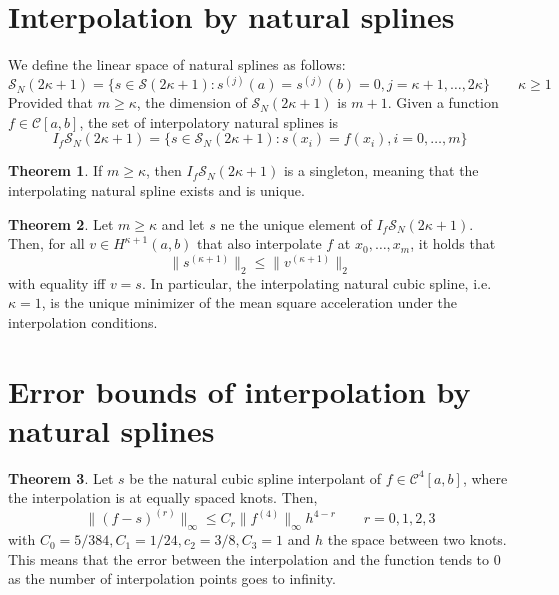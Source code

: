 \documentclass[12pt, openany]{report}
\theoremstyle{definition}
\newtheorem{thm}{Theorem}[chapter]
\begin{document}
\section{Interpolation by natural splines}
We define the linear space of natural splines as follows:
\begin{equation}
    \mathcal{S}_N(2\kappa +1) = \{s\in \mathcal{S}(2\kappa+1):s^{(j)}(a)=s^{(j)}(b)=0,j=\kappa+1,\dots,2\kappa\} \qquad \kappa \ge 1
\end{equation}
Provided that $m\ge\kappa$, the dimension of $\mathcal{S}_N(2\kappa+1)$ is $m+1$. Given a function $f\in \mathcal{C}[a,b]$, the set of interpolatory natural splines is 
\begin{equation}
    I_f\mathcal{S}_N(2\kappa+1)=\{s\in \mathcal{S}_N(2\kappa+1):s(x_i)=f(x_i), i=0,\dots,m\}
\end{equation}
\begin{thm}
    If $m\ge \kappa$, then $I_f\mathcal{S}_N(2\kappa+1)$ is a singleton, meaning that the interpolating natural spline exists and is unique. 
\end{thm}
\begin{thm}
    Let $m\ge \kappa$ and let $s$ ne the unique element of $I_f\mathcal{S}_N(2\kappa+1)$. Then, for all $v\in H^{\kappa+1}(a,b)$ that also interpolate $f$ at $x_0,\dots,x_m$, it holds that 
    \begin{equation}
        \lVert s^{(\kappa+1)}\rVert_2 \le \lVert v^{(\kappa+1)}\rVert_2
    \end{equation}
    with equality iff $v=s$. In particular, the interpolating natural cubic spline, i.e. $\kappa=1$, is the unique minimizer of the mean square acceleration under the interpolation conditions. 
\end{thm}
\section{Error bounds of interpolation by natural splines}
\begin{thm}
    Let $s$ be the natural cubic spline interpolant of $f\in \mathcal{C}^4[a,b]$, where the interpolation is at equally spaced knots. Then, 
    \begin{equation}
        \lVert (f-s)^{(r)}\rVert_{\infty} \le C_r \lVert f^{(4)}\rVert_{\infty}h^{4-r} \qquad r=0,1,2,3
    \end{equation}
    with $C_0 = 5/384, C_1 = 1/24,c_2=3/8, C_3=1$ and $h$ the space between two knots. This means that the error between the interpolation and the function tends to 0 as the number of interpolation points goes to infinity.
\end{thm}
\end{document}
